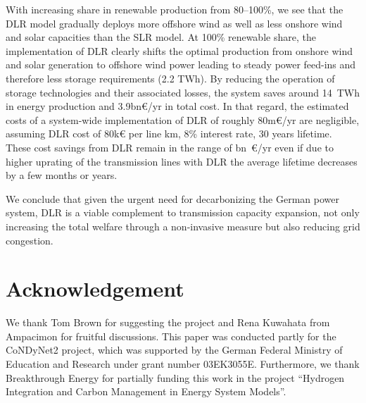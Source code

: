 \documentclass[preprint,12pt]{elsarticle}
\begin{document}
With increasing share in renewable production from 80--100\%, we see that the DLR model gradually deploys more offshore wind as well as less onshore wind and solar capacities than the SLR model. At  100\% renewable share, the implementation of DLR clearly shifts the optimal production from onshore wind and solar generation to offshore wind power leading to steady power feed-ins and therefore less storage requirements (2.2 TWh). By reducing the operation of storage technologies and their associated losses, the system saves around 14~TWh in energy production and 3.9bn\euro{}/yr in total cost. In that regard, the estimated costs of a system-wide implementation of DLR of roughly 80m\euro{}/yr are negligible, assuming DLR cost of 80k\euro{} per line km, 8\% interest rate, 30 years lifetime.
These cost savings from DLR remain in the range of bn~\euro{}/yr even if due to higher uprating of the transmission lines with DLR the average lifetime decreases by a few months or years.

We conclude that given the urgent need for decarbonizing the German power system, DLR is a viable complement to transmission capacity expansion, not only increasing the total welfare through a non-invasive measure but also reducing grid congestion.

\section*{Acknowledgement}
We thank Tom Brown for suggesting the project and Rena Kuwahata from Ampacimon for fruitful discussions.
This paper was conducted partly for the CoNDyNet2 project, which was supported by the German Federal Ministry of Education and Research under grant number 03EK3055E.
Furthermore, we thank Breakthrough Energy for partially funding this work in the project “Hydrogen
Integration and Carbon Management in Energy System Models”.
\newpage


\appendix

\section{}
\setcounter{figure}{0}
\setcounter{table}{0}
\end{document}
